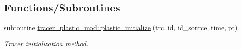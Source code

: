 \subsection*{Functions/\+Subroutines}
\begin{DoxyCompactItemize}
\item 
subroutine \hyperlink{namespacetracer__plastic__mod_a42882cd86cfe30f341d8150582a664a9}{tracer\+\_\+plastic\+\_\+mod\+::plastic\+\_\+initialize} (trc, id, id\+\_\+source, time, pt)
\begin{DoxyCompactList}\small\item\em Tracer initialization method. \end{DoxyCompactList}\end{DoxyCompactItemize}
